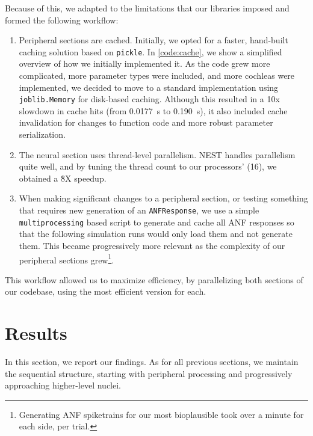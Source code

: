 \documentclass[11pt,a4paper]{article}
\begin{document}
Because of this, we adapted to the limitations that our libraries imposed and formed the following workflow:
\begin{enumerate}
    \item Peripheral sections are cached. Initially, we opted for a faster, hand-built caching solution based on \lstinline{pickle}. In \ref{code:cache}, we show a simplified overview of how we initially implemented it.
    As the code grew more complicated, more parameter types were included, and more cochleas were implemented, we decided to move to a standard implementation using \lstinline{joblib.Memory} for disk-based caching. Although this resulted in a 10x slowdown in cache hits (from \qty{0.0177}{\second} to \qty{0.190}{\second}), it also included cache invalidation for changes to function code and more robust parameter serialization.
    \item The neural section uses thread-level parallelism. NEST handles parallelism quite well, and by tuning the thread count to our processors' (16), we obtained a \~8X speedup.
    \item When making significant changes to a peripheral section, or testing something that requires new generation of an \lstinline{ANFResponse}, we use a simple \lstinline{multiprocessing} based script to generate and cache all ANF responses so that the following simulation runs would only load them and not generate them. This became progressively more relevant as the complexity of our peripheral sections grew\footnote{Generating ANF spiketrains for our most bioplausible took over a minute for each side, per trial.}.
\end{enumerate}
This workflow allowed us to maximize efficiency, by parallelizing both sections of our codebase, using the most efficient version for each.

\newpage

\section{Results}
In this section, we report our findings. As for all previous sections, we maintain the sequential structure, starting with peripheral processing and progressively approaching higher-level nuclei.
\end{document}

